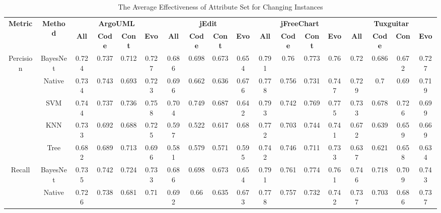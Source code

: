 {\begin{table*}[ht]
\scriptsize
\caption{The Average Effectiveness of Attribute Set for Changing Instances}
\label{changingsetavg}
\centering
\begin{tabular}{|c|c|c|c|c|c|c|c|c|c|c|c|c|c|c|c|c|c|}
\hline
\multirow{2}{*}{\textbf{Metric}}&\multirow{2}{*}{\textbf{Method}}&\multicolumn{4}{|c|}{\textbf{ArgoUML}}&\multicolumn{4}{|c|}{\textbf{jEdit}}&\multicolumn{4}{|c|}{\textbf{jFreeChart}}&\multicolumn{4}{|c|}{\textbf{Tuxguitar}}\\
\cline{3-18}
&&\textbf{All}&\textbf{Code}&\textbf{Cont}&\textbf{Evo}&\textbf{All}&\textbf{Code}&\textbf{Cont}&\textbf{Evo}&\textbf{All}&\textbf{Code}&\textbf{Cont}&\textbf{Evo}&\textbf{All}&\textbf{Code}&\textbf{Con}&\textbf{Evo}~\\
\hline
\multirow{5}{*}{Percision}
&BayesNet&	0.724&	0.737&	0.712&	0.727&		0.686&	0.698&	0.673&	0.654&	0.791&	0.76&	0.773&	0.76&		0.72&	0.686&	0.672&	0.727\\
&Native&	0.734&	0.743&	0.693&	0.723&		0.696&	0.662&	0.636&	0.676&	0.778&	0.756&	0.731&	0.747&		0.729&	0.7	&0.69&	0.719\\
&SVM&	0.744&	0.737&	0.736&	0.758&		0.704&	0.749&	0.687&	0.642&		0.793&	0.742&	0.769&	0.775&		0.733&	0.678&	0.726&	0.699\\
&KNN&	0.733&	0.692&	0.688&	0.725&		0.597&	0.522&	0.617&	0.68&		0.772&	0.703&	0.744&	0.741&		0.672&	0.639&	0.659&	0.669\\
&Tree&	0.682&	0.689&	0.713&	0.696&		0.581&	0.579&	0.571&	0.595&		0.742&	0.746&	0.711&	0.733&		0.637&	0.621&	0.658&	0.634\\
\hline
\multirow{5}{*}{Recall}
&BayesNet&	0.735&	0.742&	0.724&	0.733&		0.686&	0.698&	0.673&	0.654&	0.791&	0.761&	0.774&	0.761&		0.746&	0.718&	0.709&	0.743\\
&Native&	0.726&	0.738&	0.681&	0.71&		0.692&	0.66&	0.635&	0.673&		0.778&	0.757&	0.732&	0.742&		0.737&	0.703&	0.686&	0.737\\

\end{tabular}
\end{table*}}
